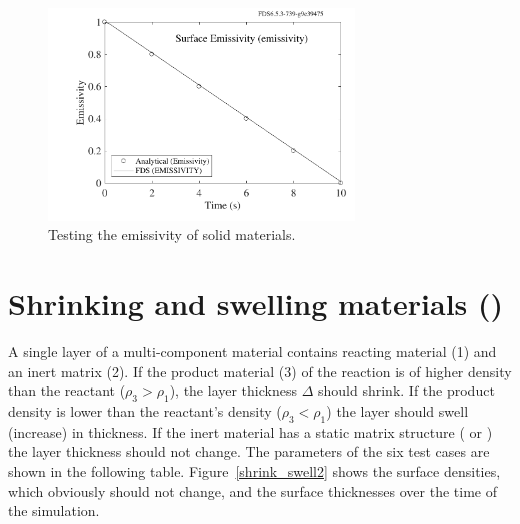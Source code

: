 \documentclass[11pt]{book}
\begin{document}
\begin{figure}[!htb]
\centering
\includegraphics[width=3.2in]{SCRIPT_FIGURES/emissivity}
\caption[The  test case]{Testing the emissivity of solid materials.}
\label{emissivity}
\end{figure}




\section{Shrinking and swelling materials (\texorpdfstring{}{shrink\_swell})}
\label{shrink_swell}

A single layer of a multi-component material contains reacting material (1) and an inert matrix (2). If the product material (3) of the reaction is of higher density than the reactant ($\rho_3 > \rho_1$), the layer thickness $\Delta$ should shrink. If the product density is lower than the reactant's density ($\rho_3 < \rho_1$) the layer should swell (increase) in thickness. If the inert material has a static matrix structure ( or ) the layer thickness should not change. The parameters of the six test cases are shown in the following table. Figure~\ref{shrink_swell2} shows the surface densities, which obviously should not change, and the surface thicknesses over the time of the simulation.
\end{document}
